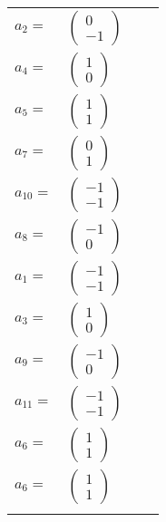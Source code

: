 \documentclass[1p]{elsarticle_modified}
\theoremstyle{definition}
\begin{document}
\begin{tabular}{m{7pt} m{180pt} m{7pt} m{180pt} }
\flushright $a_{2}=$&$\begin{pmatrix}0\\-1\end{pmatrix}$ \\
\flushright $a_{4}=$&$\begin{pmatrix}1\\0\end{pmatrix}$ \\
\flushright $a_{5}=$&$\begin{pmatrix}1\\1\end{pmatrix}$ \\
\flushright $a_{7}=$&$\begin{pmatrix}0\\1\end{pmatrix}$ \\
\flushright $a_{10}=$&$\begin{pmatrix}-1\\-1\end{pmatrix}$ \\
\flushright $a_{8}=$&$\begin{pmatrix}-1\\0\end{pmatrix}$ \\
\flushright $a_{1}=$&$\begin{pmatrix}-1\\-1\end{pmatrix}$ \\
\flushright $a_{3}=$&$\begin{pmatrix}1\\0\end{pmatrix}$ \\
\flushright $a_{9}=$&$\begin{pmatrix}-1\\0\end{pmatrix}$ \\
\flushright $a_{11}=$&$\begin{pmatrix}-1\\-1\end{pmatrix}$ \\
\flushright $a_{6}=$&$\begin{pmatrix}1\\1\end{pmatrix}$\\ \flushright $a_{6}=$&$\begin{pmatrix}1\\1\end{pmatrix}$\\&\end{tabular}
\end{document}
